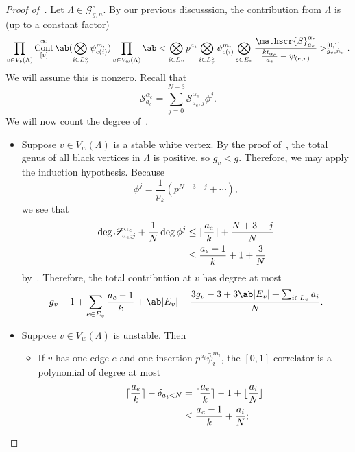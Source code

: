 \documentclass[10pt]{amsart}
\DeclarePairedDelimiter{\floor}{\lfloor}{\rfloor}
\DeclarePairedDelimiter{\ceil}{\lceil}{\rceil}
\theoremstyle{definition}
\theoremstyle{remark}
\theoremstyle{plain}
\theoremstyle{definition}
\theoremstyle{remark}
\newcommand{\mc}[1]{\mathcal{#1}}
\newcommand{\msc}[1]{\mathscr{#1}}
\newcommand{\1}{\mathbf{1}}
\newcommand{\2}{\mathbf{2}}
\newcommand{\3}{\mathbf{3}}
\DeclareMathOperator{\Cont}{Cont}
\numberwithin{equation}{section}
\begin{document}
\begin{proof}[Proof of~]
    Let $\Lambda \in \msc{G}_{g,n}^{\circ}$. By our previous discusssion, the contribution from $\Lambda$ is (up to a constant factor)
    \begin{equation}\label{eqn:bipartitecontancestor}
    \prod_{v \in V_b(\Lambda)} \Cont_{[v]}^{\infty}\ab(\bigotimes_{i \in L_v^{\circ}} \bar{\psi}_{c(i)}^{m_i}) 
        \prod_{v \in V_w(\Lambda)} \ab<\bigotimes_{i \in L_v} p^{a_i} \bigotimes_{i \in L_v^{\circ}} \bar{\psi}_{c(i)}^{m_i} \bigotimes_{e \in E_v} \frac{\msc{S}_{a_e}^{\alpha_e}}{\frac{k t_{\alpha_e}}{a_e} - \bar{\psi}_{ (e,v) }}>_{g_v, n_v}^{[0,1]} .
    \end{equation}
        We will assume this is nonzero. Recall that 
        \[ \mc{S}_{a_e}^{\alpha_e} = \sum_{j=0}^{N+3} \msc{S}_{a_e; j}^{\alpha_e} \phi^j. \]
        We will now count the degree of~.
        \begin{itemize}
            \item Suppose $v \in V_w(\Lambda)$ is a stable white vertex. By the proof of~, the total genus of all black vertices in $\Lambda$ is positive, so $g_v < g$. Therefore, we may apply the induction hypothesis. Because
                \[ \phi^j = \frac{1}{p_k}(p^{N+3-j} + \cdots), \]
                we see that
                \begin{align*}
                    \deg \msc{S}_{a_e; j}^{\alpha_e} + \frac{1}{N} \deg \phi^j &\leq \ceil{\frac{a_e}{k}} + \frac{N+3-j}{N} \\
                    &\leq \frac{a_e-1}{k} + 1 + \frac{3}{N}
                \end{align*}
                by~. Therefore, the total contribution at $v$ has degree at most
                \[ g_v - 1 + \sum_{e \in E_v} \frac{a_e-1}{k} + \ab|E_v| + \frac{3g_v-3 + 3\ab|E_v|+\sum_{i \in L_v} a_i}{N}. \]
            \item Suppose $v \in V_w(\Lambda)$ is unstable. Then
                \begin{itemize}
                    \item If $v$ has one edge $e$ and one insertion $p^{a_i} \bar{\psi}_i^{m_i}$, the $[0,1]$ correlator is a polynomial of degree at most
                        \begin{align*}
                            \ceil{\frac{a_e}{k}} - \delta_{a_i < N} &= \ceil{\frac{a_e}{k}} - 1 + \floor{\frac{a_i}{N}} \\
                            &\leq \frac{a_e-1}{k} + \frac{a_i}{N};

\end{align*}
\end{itemize}
\end{itemize}
\end{proof}
\end{document}

